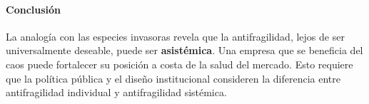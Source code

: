 \documentclass[a4paper,12pt]{article}
\begin{document}
\paragraph{Conclusión}

La analogía con las especies invasoras revela que la antifragilidad, lejos de ser universalmente deseable, puede ser \textbf{asistémica}. Una empresa que se beneficia del caos puede fortalecer su posición a costa de la salud del mercado. Esto requiere que la política pública y el diseño institucional consideren la diferencia entre antifragilidad individual y antifragilidad sistémica.
\end{document}

